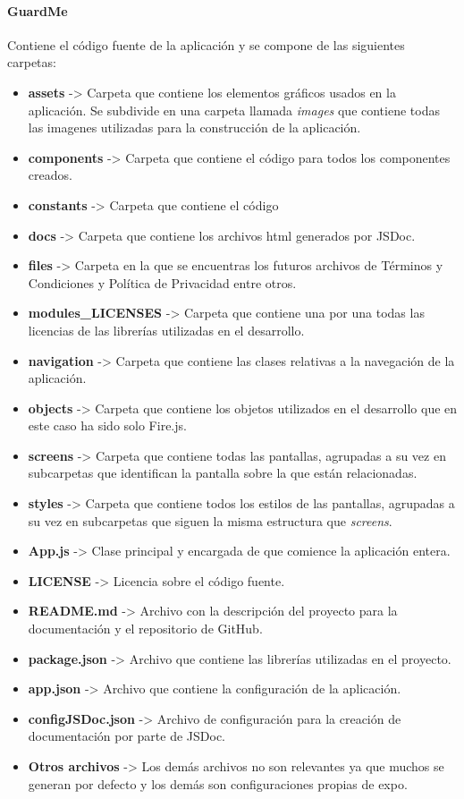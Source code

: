 \documentclass[11pt]{report}
\begin{document}
\paragraph*{GuardMe}
Contiene el código fuente de la aplicación y se compone de las siguientes carpetas:
\begin{itemize}
	\item \textbf{assets} -> Carpeta que contiene los elementos gráficos usados en la aplicación. Se subdivide en una carpeta llamada \textit{images} que contiene todas las imagenes utilizadas para la construcción de la aplicación.
	\item \textbf{components} -> Carpeta que contiene el código para todos los componentes creados.
	\item \textbf{constants} -> Carpeta que contiene el código
	\item \textbf{docs} -> Carpeta que contiene los archivos html generados por JSDoc.
	\item \textbf{files} -> Carpeta en la que se encuentras los futuros archivos de Términos y Condiciones y Política de Privacidad entre otros.
	\item \textbf{modules\_LICENSES} -> Carpeta que contiene una por una todas las licencias de las librerías utilizadas en el desarrollo.
	\item \textbf{navigation} -> Carpeta que contiene las clases relativas a la navegación de la aplicación.
	\item \textbf{objects} -> Carpeta que contiene los objetos utilizados en el desarrollo que en este caso ha sido solo Fire.js.
	\item \textbf{screens} -> Carpeta que contiene todas las pantallas, agrupadas a su vez en subcarpetas que identifican la pantalla sobre la que están relacionadas.
	\item \textbf{styles} -> Carpeta que contiene todos los estilos de las pantallas, agrupadas a su vez en subcarpetas que siguen la misma estructura que \textit{screens}.
	\item \textbf{App.js} -> Clase principal y encargada de que comience la aplicación entera.
	\item \textbf{LICENSE} -> Licencia sobre el código fuente.
	\item \textbf{README.md} -> Archivo con la descripción del proyecto para la documentación y el repositorio de GitHub.
	\item \textbf{package.json} -> Archivo que contiene las librerías utilizadas en el proyecto.
	\item \textbf{app.json} -> Archivo que contiene la configuración de la aplicación.
	\item \textbf{configJSDoc.json} -> Archivo de configuración para la creación de documentación por parte de JSDoc.
	\item \textbf{Otros archivos} -> Los demás archivos no son relevantes ya que muchos se generan por defecto y los demás son configuraciones propias de expo.
\end{itemize}

\newpage
\nocite{*} %
 


\newpage
\end{document}

